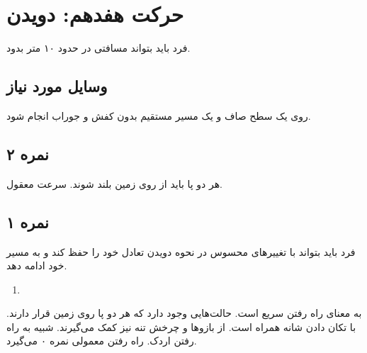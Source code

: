 \documentclass[12pt]{report}
\begin{document}
	\section*{حرکت هفدهم: دویدن}
	فرد باید بتواند مسافتی در حدود ۱۰ متر بدود.
	\subsection*{وسایل مورد نیاز}
	روی یک سطح صاف و یک مسیر مستقیم بدون کفش و جوراب انجام شود.
	\subsection*{نمره ۲}
	هر دو پا باید از روی زمین بلند شوند. سرعت معقول.
	\subsection*{نمره ۱}
	فرد باید بتواند با تغییر‌های محسوس در نحوه دویدن تعادل خود را حفظ کند و به مسیر خود ادامه دهد.
	\begin{enumerate}
		\item {}
	\end{enumerate}
	به معنای راه رفتن سریع است. حالت‌هایی وجود دارد که هر دو پا روی زمین قرار دارند. با تکان دادن شانه‌ همراه است. از بازو‌ها و چرخش تنه نیز کمک می‌گیرند. شبیه به راه رفتن اردک. راه رفتن معمولی نمره ۰ می‌گیرد.
\end{document}
